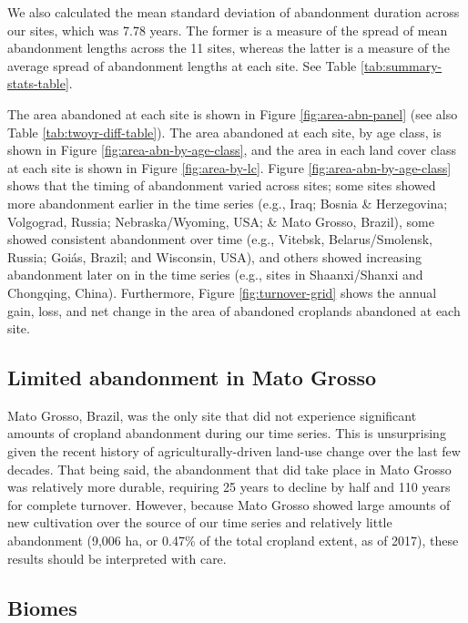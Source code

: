 \documentclass[9pt,lineno]{pnas-new}
\begin{document}
We also calculated the mean standard deviation of abandonment duration across our sites, which was 7.78 years.
The former is a measure of the spread of mean abandonment lengths across the 11 sites, whereas the latter is a measure of the average spread of abandonment lengths at each site.
See Table \ref{tab:summary-stats-table}.

The area abandoned at each site is shown in Figure \ref{fig:area-abn-panel} (see also Table \ref{tab:twoyr-diff-table}).
The area abandoned at each site, by age class, is shown in Figure \ref{fig:area-abn-by-age-class}, and the area in each land cover class at each site is shown in Figure \ref{fig:area-by-lc}.
Figure \ref{fig:area-abn-by-age-class} shows that the timing of abandonment varied across sites; some sites showed more abandonment earlier in the time series (e.g., Iraq; Bosnia \& Herzegovina; Volgograd, Russia; Nebraska/Wyoming, USA; \& Mato Grosso, Brazil), some showed consistent abandonment over time (e.g., Vitebsk, Belarus/Smolensk, Russia; Goiás, Brazil; and Wisconsin, USA), and others showed increasing abandonment later on in the time series (e.g., sites in Shaanxi/Shanxi and Chongqing, China).
Furthermore, Figure \ref{fig:turnover-grid} shows the annual gain, loss, and net change in the area of abandoned croplands abandoned at each site.

\hypertarget{mato-grosso}{%
\subsection{Limited abandonment in Mato Grosso}\label{mato-grosso}}

Mato Grosso, Brazil, was the only site that did not experience significant amounts of cropland abandonment during our time series.
This is unsurprising given the recent history of agriculturally-driven land-use change over the last few decades.
That being said, the abandonment that did take place in Mato Grosso was relatively more durable, requiring 25 years to decline by half and 110 years for complete turnover.
However, because Mato Grosso showed large amounts of new cultivation over the source of our time series and relatively little abandonment (9,006 ha, or 0.47\% of the total cropland extent, as of 2017), these results should be interpreted with care.

\hypertarget{biomes}{%
\subsection{Biomes}\label{biomes}}
\end{document}
